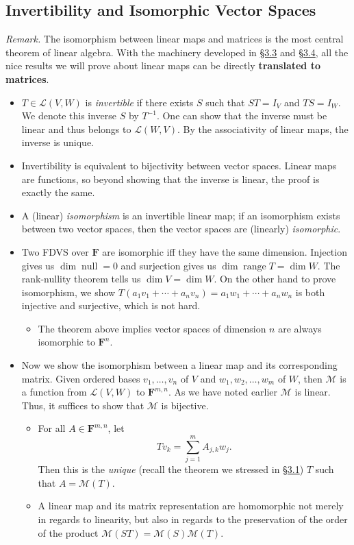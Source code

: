 \documentclass[11pt]{article}
\newcommand{\lk}[2]{\hyperlink{subsection.#1.#2}{\S#1.#2}}
\newcommand{\df}[1]{\textit{\textsf{#1}}}
\newcommand{\F}{\mathbf{F}}
\newcommand{\n}{\operatorname{null}}
\renewcommand{\r}{\operatorname{range}}
\renewcommand{\d}{\dim}
\newcommand{\LVW}{\mathcal{L}(V,W)}
\newcommand{\M}{\mathcal{M}}
\newcommand{\bv}{v_1,\dots,v_n}
\begin{document}
\subsection{Invertibility and Isomorphic Vector Spaces}
\textit{Remark.} The isomorphism between linear maps and matrices is the most central theorem of linear algebra. With the machinery developed in \lk{3}{3} and \lk{3}{4}, all the nice results we will prove about linear maps can be directly \textbf{translated to matrices}.
\begin{itemize}
    \item $T \in \LVW$ is \df{invertible} if there exists $S$ such that $ST = I_V$ and $TS = I_W$. We denote this inverse $S$ by $T^{-1}$. One can show that the inverse must be linear and thus belongs to $\mathcal{L}(W,V)$. By the associativity of linear maps, the inverse is unique.
    \item Invertibility is equivalent to bijectivity between vector spaces. Linear maps are functions, so beyond showing that the inverse is linear, the proof is exactly the same.
    \item A (linear) \df{isomorphism} is an invertible linear map; if an isomorphism exists between two vector spaces, then the vector spaces are (linearly) \df{isomorphic}.
    \item Two FDVS over $\F$ are isomorphic iff they have the same dimension. Injection gives us $\d \n = 0$ and surjection gives us $\d \r T = \d W$. The rank-nullity theorem tells us $\d V = \d W$. On the other hand to prove isomorphism, we show $T(a_1v_1+\cdots+a_nv_n) = a_1w_1+\cdots+a_nw_n$ is both injective and surjective, which is not hard.
    \begin{itemize}
        \item The theorem above implies vector spaces of dimension $n$ are always isomorphic to $\F^n$.
    \end{itemize}
    \item Now we show the isomorphism between a linear map and its corresponding matrix. Given ordered bases $\bv$ of $V$ and $w_1,w_2,\dots,w_m$ of $W$, then $\M$ is a function from $\LVW$ to $\F^{m,n}$. As we have noted earlier $\M$ is linear. Thus, it suffices to show that $\M$ is bijective.
    \begin{itemize}
        \item For all $A \in \F^{m,n}$, let $$Tv_k = \sum_{j = 1}^m A_{j,k}w_j.$$ Then this is the \emph{unique} (recall the theorem we stressed in \lk{3}{1}) $T$ such that $A = \M(T)$.
        \item A linear map and its matrix representation are homomorphic not merely in regards to linearity, but also in regards to the preservation of the order of the product $\M(ST) = \M(S)\M(T)$.

\end{itemize}
\end{itemize}
\end{document}
